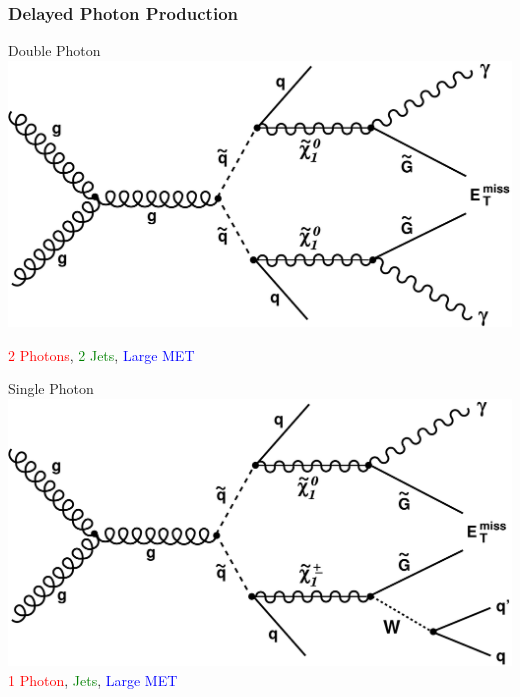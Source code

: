 \documentclass{beamer}
\begin{document}
\begin{frame}
\frametitle{Delayed Photon Production}   
  \fboxsep=0pt  
  \begin{varblock}[7cm]{Double Photon}
   \centering
    \includegraphics[width=0.50\linewidth]{THESISPLOTS/Diphoton_squark.pdf}
       
     \large{ \textcolor{red}{2 Photons}, \textcolor{green}{2 Jets}, \textcolor{blue}{Large MET} }   
     \end{varblock}%
     \vspace{-0.3cm}
     \begin{varblock}[7cm]{Single Photon}
    \centering
       \includegraphics[width=0.50\linewidth]{THESISPLOTS/SinglePhoton_squark.pdf}
       \newline
       \large{ \textcolor{red}{1 Photon}, \textcolor{green}{Jets}, \textcolor{blue}{Large MET} }
    \end{varblock}
\end{frame}
\end{document}
